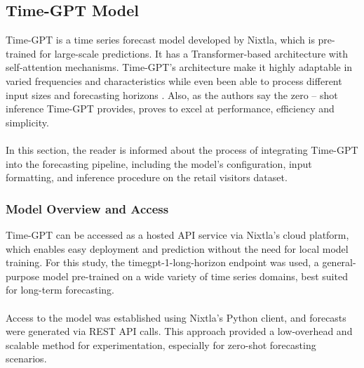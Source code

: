 \documentclass{article}
\begin{document}
\newpage
\subsection{Time-GPT Model}
Time-GPT is a time series forecast  model developed by Nixtla, which is 
pre-trained for large-scale predictions. It has a Transformer-based architecture with self-attention mechanisms. Time-GPT's architecture make it highly adaptable in varied frequencies and characteristics while even been able to process different input sizes and forecasting horizons \cite{garza2024timegpt1}. Also, as the authors say the zero – shot inference Time-GPT provides, proves to excel at performance, efficiency and simplicity.\\
\\
In this section, the reader is informed about the process of integrating Time-GPT into the forecasting pipeline, including the model’s configuration, input formatting, and inference procedure on the retail visitors dataset.


\subsubsection{Model Overview and Access}
Time-GPT can be accessed as a hosted API service via Nixtla’s cloud platform, which enables easy deployment and prediction without the need for local model training. For this study, the timegpt-1-long-horizon endpoint was used, a general-purpose model pre-trained on a wide variety of time series domains, best suited for long-term forecasting.\\
\\
Access to the model was established using Nixtla’s Python client, and forecasts were generated via REST API calls. This approach provided a low-overhead and scalable method for experimentation, especially for zero-shot forecasting scenarios.
\end{document}
